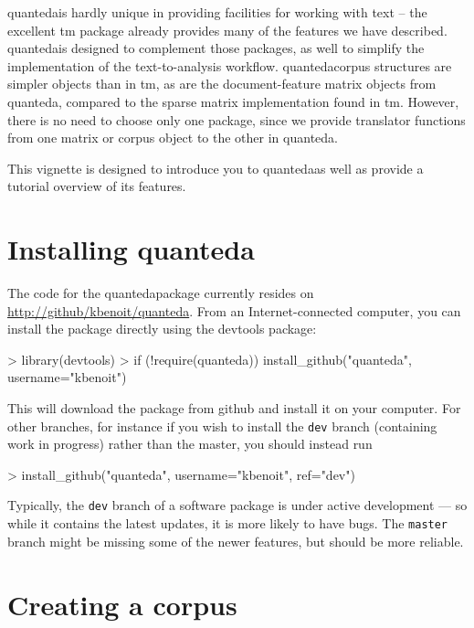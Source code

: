 \documentclass[11pt]{article}
\newcommand{\quanteda}{\textsf{quanteda}}
\begin{document}
\quanteda is hardly unique in providing facilities for working with
text -- the excellent \textsf{tm} package already provides many of the
features we have described.  \quanteda is designed to complement those
packages, as well to simplify the implementation of the
text-to-analysis workflow.  \quanteda corpus structures are simpler
objects than in \textsf{tm}, as are the document-feature matrix
objects from \quanteda, compared to the sparse matrix implementation
found in \textsf{tm}.  However, there is no need to choose only one
package, since we provide translator functions from one matrix or
corpus object to the other in \quanteda.

This vignette is designed to introduce you to \quanteda as well as
provide a tutorial overview of its features.

\section{Installing \quanteda}

The code for the \quanteda package currently resides on
\url{http://github/kbenoit/quanteda}.  From an Internet-connected
computer, you can install the package directly using the
\textsf{devtools} package:

\begin{Schunk}
\begin{Sinput}
> library(devtools)
> if (!require(quanteda)) install_github("quanteda", username="kbenoit")
\end{Sinput}
\end{Schunk}

This will download the package from github and install it on your computer.
For other branches, for instance if you wish to install the
\texttt{dev} branch (containing work in progress) rather than the
master, you should instead run

\begin{Schunk}
\begin{Sinput}
> install_github("quanteda", username="kbenoit", ref="dev")
\end{Sinput}
\end{Schunk}

Typically, the \texttt{dev} branch of a software package is under active development --- so while it contains the latest updates, it is more likely to have bugs. The \texttt{master} branch might be missing some of the newer features, but should be more reliable.

\section{Creating a corpus}
\end{document}
